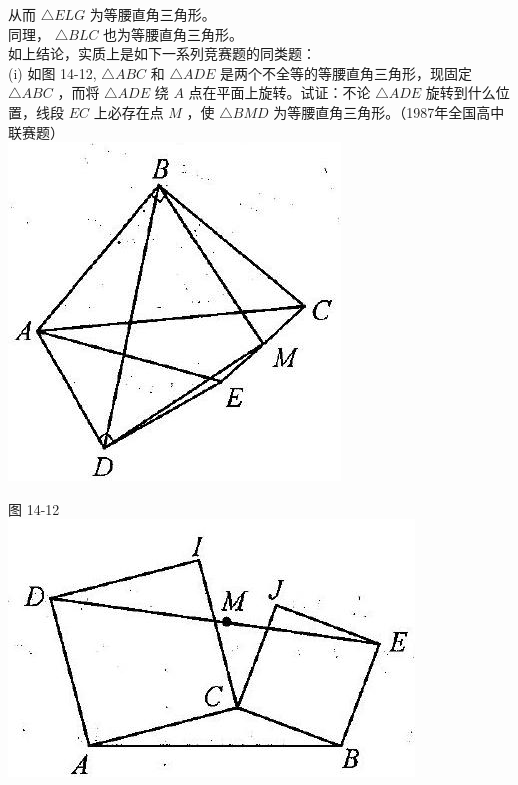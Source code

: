 \documentclass[10pt]{article}
\begin{document}
从而 $\triangle E L G$ 为等腰直角三角形。\\
同理， $\triangle B L C$ 也为等腰直角三角形。\\
如上结论，实质上是如下一系列竞赛题的同类题：\\
(i) 如图 14-12, $\triangle A B C$ 和 $\triangle A D E$ 是两个不全等的等腰直角三角形，现固定 $\triangle A B C$ ，而将 $\triangle A D E$ 绕 $A$ 点在平面上旋转。试证：不论 $\triangle A D E$ 旋转到什么位置，线段 $E C$ 上必存在点 $M$ ，使 $\triangle B M D$ 为等腰直角三角形。（1987年全国高中联赛题）\\
\includegraphics[max width=\textwidth, center]{2024_10_30_2c8f45efd4a519b08e1ag-134}

图 14-12\\
\includegraphics[max width=\textwidth, center]{2024_10_30_2c8f45efd4a519b08e1ag-134(2)}
\end{document}
